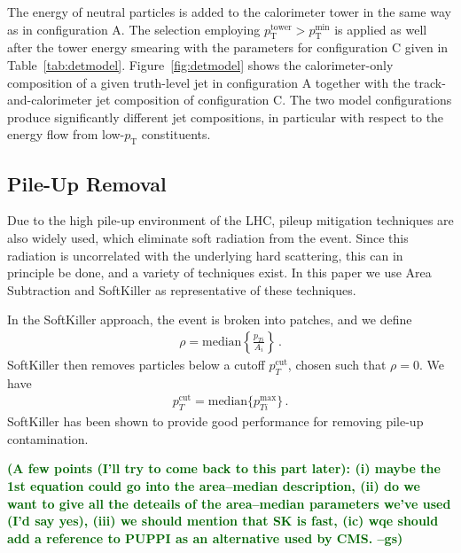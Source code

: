 \documentclass[11pt,letterpaper]{article}
\newcommand{\pt}{\ensuremath{p_{\text{T}}}}
\newcommand{\ptmin}{\ensuremath{p_{\text{T}}^{\text{min}}}}
\newcommand{\pttower}{\ensuremath{p_{\text{T}}^{\text{tower}}}}
\newcommand{\gs}[1]{\textbf{\textcolor{darkgreen}{(#1 --gs)}}}
\begin{document}
The energy of neutral particles is added to the calorimeter tower in the same way as in configuration A. 
The selection employing $\pttower > \ptmin$ is applied as well after the tower energy smearing with the parameters for configuration C given in Table~\ref{tab:detmodel}. 
Figure~\ref{fig:detmodel} shows the calorimeter-only composition of a given truth-level jet in configuration A together with the track-and-calorimeter jet composition of configuration C.
The two model configurations produce significantly different jet compositions, in particular with respect to the energy flow from low-\pt{} constituents.










\subsection{Pile-Up Removal}\label{sec:pu_tech}

Due to the high pile-up environment of the LHC, pileup mitigation techniques \cite{Cacciari:2007fd,Alon:2011xb,Soyez:2012hv,Tseng:2013dva,Krohn:2013lba,Cacciari:2014gra,Bertolini:2014bba} are also widely used, which eliminate soft radiation from the event.
%
Since this radiation is uncorrelated with the underlying hard scattering, this can in principle be done, and a variety of techniques exist.
%
In this paper we use Area Subtraction \cite{Cacciari:2007fd,Cacciari:2008gn} and SoftKiller \cite{Cacciari:2014gra} as representative of these techniques.

In the SoftKiller approach, the event is broken into patches, and we define
\begin{align}
\rho= \text{median} \left \{ \frac{p_{Ti}}{A_i}   \right \}\,.
\end{align}
SoftKiller then removes particles below a cutoff $p_T^{\text{cut}}$, chosen such that $\rho=0$. We have
\begin{align}
p_T^{\text{cut}}=\text{median} \{ p_{Ti}^{\text{max}} \}\,.
\end{align}
SoftKiller has been shown to provide good performance for removing pile-up contamination.

\gs{A few points (I'll try to come back to
  this part later): (i) maybe the 1st equation could go into the
  area--median description, (ii) do we want to give all the deteails
  of the area--median parameters we've used (I'd say yes), (iii) we
  should mention that SK is fast, (ic) wqe should add a reference to
  PUPPI as an alternative used by CMS.}
\end{document}
